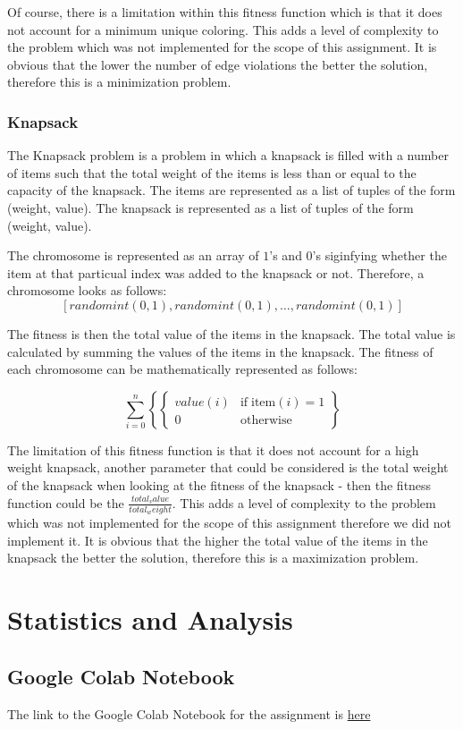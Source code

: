 \documentclass[11pt, letterpaper]{article}
\begin{document}
Of course, there is a limitation within this fitness function which is that it does not account for a minimum unique coloring. This adds a level of complexity to the problem which was not implemented for the scope of this assignment. It is obvious that the lower the number of edge violations the better the solution, therefore this is a minimization problem.
\subsubsection{Knapsack}
The Knapsack problem is a problem in which a knapsack is filled with a number of items such that the total weight of the items is less than or equal to the capacity of the knapsack. The items are represented as a list of tuples of the form (weight, value). The knapsack is represented as a list of tuples of the form (weight, value). 

The chromosome is represented as an array of $1$'s and $0$'s siginfying whether the item at that particual index was added to the knapsack or not. Therefore, a chromosome looks as follows:
$$[randomint(0,1), randomint(0,1), \dots, randomint(0,1)]$$

The fitness is then the total value of the items in the knapsack. The total value is calculated by summing the values of the items in the knapsack. The fitness of each chromosome can be mathematically represented as follows:

$$\sum_{i=0}^{n} \left\{ \left\{ \begin{array}{ll} value(i) & \text{if} \; \text{item}(i) = 1 \\ 0 & \text{otherwise} \end{array} \right. \right\}$$

The limitation of this fitness function is that it does not account for a high weight knapsack, another parameter that could be considered is the total weight of the knapsack when looking at the fitness of the knapsack - then the fitness function could be the $\frac{total_value}{total_weight}$. This adds a level of complexity to the problem which was not implemented for the scope of this assignment therefore we did not implement it. It is obvious that the higher the total value of the items in the knapsack the better the solution, therefore this is a maximization problem.
\section{Statistics and Analysis}
\subsection {Google Colab Notebook}
The link to the Google Colab Notebook for the assignment is \href{https://colab.research.google.com/drive/1AgRRDJZLwOUPDDmhBcisCZp-pijTVeMK?usp=sharing}{here}
\end{document}
